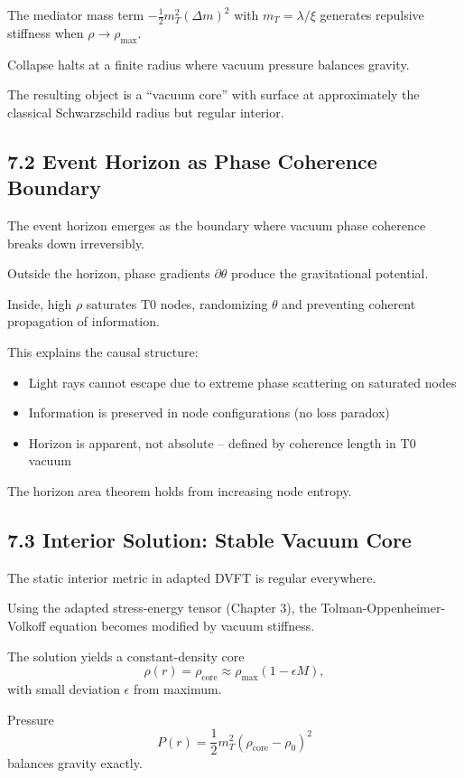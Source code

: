 	The mediator mass term $-\frac{1}{2} m_T^2 (\Delta m)^2$ with $m_T = \lambda / \xi$ generates repulsive stiffness when $\rho \to \rho_{\text{max}}$.
	
	Collapse halts at a finite radius where vacuum pressure balances gravity.
	
	The resulting object is a ``vacuum core'' with surface at approximately the classical Schwarzschild radius but regular interior.
	
	\subsection{7.2 Event Horizon as Phase Coherence Boundary}
	
	The event horizon emerges as the boundary where vacuum phase coherence breaks down irreversibly.
	
	Outside the horizon, phase gradients $\partial \theta$ produce the gravitational potential.
	
	Inside, high $\rho$ saturates T0 nodes, randomizing $\theta$ and preventing coherent propagation of information.
	
	This explains the causal structure:
	\begin{itemize}
		\item Light rays cannot escape due to extreme phase scattering on saturated nodes
		\item Information is preserved in node configurations (no loss paradox)
		\item Horizon is apparent, not absolute – defined by coherence length in T0 vacuum
	\end{itemize}
	
	The horizon area theorem holds from increasing node entropy.
	
	\subsection{7.3 Interior Solution: Stable Vacuum Core}
	
	The static interior metric in adapted DVFT is regular everywhere.
	
	Using the adapted stress-energy tensor (Chapter 3), the Tolman-Oppenheimer-Volkoff equation becomes modified by vacuum stiffness.
	
	The solution yields a constant-density core
	\[
	\rho(r) = \rho_{\text{core}} \approx \rho_{\text{max}} (1 - \epsilon M),
	\]
	with small deviation $\epsilon$ from maximum.
	
	Pressure
	\[
	P(r) = \frac{1}{2} m_T^2 (\rho_{\text{core}} - \rho_0)^2
	\]
	balances gravity exactly.
	
